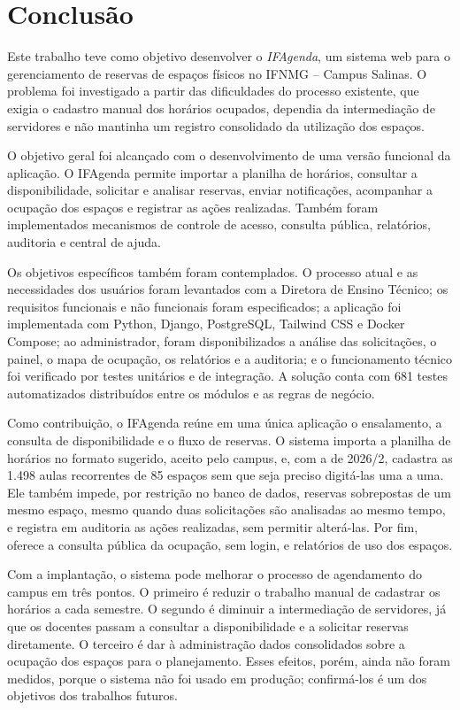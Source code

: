\chapter{Conclusão} 
\label{cap5_conclusao} 

Este trabalho teve como objetivo desenvolver o \textit{IFAgenda}, um sistema web para o gerenciamento de reservas de espaços físicos no IFNMG -- Campus Salinas. O problema foi investigado a partir das dificuldades do processo existente, que exigia o cadastro manual dos horários ocupados, dependia da intermediação de servidores e não mantinha um registro consolidado da utilização dos espaços.

O objetivo geral foi alcançado com o desenvolvimento de uma versão funcional da aplicação. O IFAgenda permite importar a planilha de horários, consultar a disponibilidade, solicitar e analisar reservas, enviar notificações, acompanhar a ocupação dos espaços e registrar as ações realizadas. Também foram implementados mecanismos de controle de acesso, consulta pública, relatórios, auditoria e central de ajuda.

Os objetivos específicos também foram contemplados. O processo atual e as necessidades dos usuários foram levantados com a Diretora de Ensino Técnico; os requisitos funcionais e não funcionais foram especificados; a aplicação foi implementada com Python, Django, PostgreSQL, Tailwind CSS e Docker Compose; ao administrador, foram disponibilizados a análise das solicitações, o painel, o mapa de ocupação, os relatórios e a auditoria; e o funcionamento técnico foi verificado por testes unitários e de integração. A solução conta com 681 testes automatizados distribuídos entre os módulos e as regras de negócio.

Como contribuição, o IFAgenda reúne em uma única aplicação o ensalamento, a consulta de disponibilidade e o fluxo de reservas. O sistema importa a planilha de horários no formato sugerido, aceito pelo campus, e, com a de 2026/2, cadastra as 1.498 aulas recorrentes de 85 espaços sem que seja preciso digitá-las uma a uma. Ele também impede, por restrição no banco de dados, reservas sobrepostas de um mesmo espaço, mesmo quando duas solicitações são analisadas ao mesmo tempo, e registra em auditoria as ações realizadas, sem permitir alterá-las. Por fim, oferece a consulta pública da ocupação, sem login, e relatórios de uso dos espaços.

Com a implantação, o sistema pode melhorar o processo de agendamento do campus em três pontos. O primeiro é reduzir o trabalho manual de cadastrar os horários a cada semestre. O segundo é diminuir a intermediação de servidores, já que os docentes passam a consultar a disponibilidade e a solicitar reservas diretamente. O terceiro é dar à administração dados consolidados sobre a ocupação dos espaços para o planejamento. Esses efeitos, porém, ainda não foram medidos, porque o sistema não foi usado em produção; confirmá-los é um dos objetivos dos trabalhos futuros.

